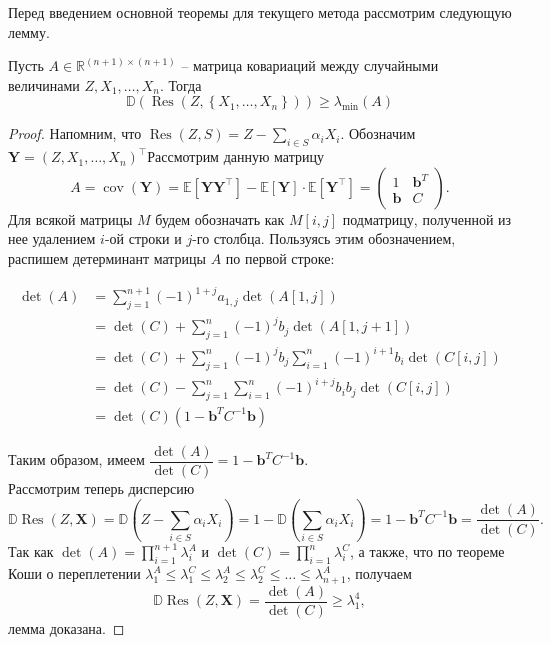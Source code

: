 \documentclass[preprint,12pt]{elsarticle}
\begin{document}
Перед введением основной теоремы для текущего метода рассмотрим следующую лемму.
\begin{lemma}
Пусть $A\in\mathbb{R}^{(n+1)\times(n+1)}$ -- матрица ковариаций между случайными величинами $Z, X_1, \dots, X_n$. Тогда 
$$\mathbb{D}\left(\operatorname{Res}\left(Z,\left\{X_{1}, \ldots, X_{n}\right\}\right)\right) \geq \lambda_{\min }(A)$$
\end{lemma}
\begin{proof}
Напомним, что 
$\operatorname{Res}(Z, S)=Z-\sum\limits_{i \in S} \alpha_{i} X_{i}$. Обозначим $\mathbf{Y}= (Z, X_1, \dots, X_n)^\top $Рассмотрим данную матрицу 
$$A=\operatorname{cov}(\mathbf{Y})=\mathbb{E}\left[\mathbf{Y Y}^{\top}\right]-\mathbb{E}[\mathbf{Y}] \cdot \mathbb{E}\left[\mathbf{Y}^{\top}\right]=\left(\begin{array}{ll}
1 & \mathbf{b}^{T} \\
\mathbf{b} & C
\end{array}\right).$$
Для всякой матрицы $M$ будем обозначать как $M[i,j]$ подматрицу, полученной из нее удалением $i$-ой строки и $j$-го столбца. Пользуясь этим обозначением, распишем детерминант матрицы $A$ по первой строке:

\begin{equation}\begin{aligned}
\operatorname{det}(A) &=\sum_{j=1}^{n+1}(-1)^{1+j} a_{1, j} \operatorname{det}(A[1, j]) \\
&=\operatorname{det}(C)+\sum_{j=1}^{n}(-1)^{j} b_{j} \operatorname{det}(A[1, j+1]) \\
&=\operatorname{det}(C)+\sum_{j=1}^{n}(-1)^{j} b_{j} \sum_{i=1}^{n}(-1)^{i+1} b_{i} \operatorname{det}(C[i, j]) \\
&=\operatorname{det}(C)-\sum_{j=1}^{n} \sum_{i=1}^{n}(-1)^{i+j} b_{i} b_{j} \operatorname{det}(C[i, j]) \\
&=\operatorname{det}(C)\left(1-\mathbf{b}^{T} C^{-1} \mathbf{b}\right)
\end{aligned}\end{equation}

Таким образом, имеем $\dfrac{\operatorname{det}(A)}{\operatorname{det}(C)}=1-\mathbf{b}^{T} C^{-1} \mathbf{b}$.\\

Рассмотрим теперь дисперсию 
\[\mathbb{D}\operatorname{Res}(Z, \mathbf{X})=\mathbb{D}(Z-\sum\limits_{i \in S} \alpha_{i} X_{i})=1-\mathbb{D}(\sum\limits_{i \in S} \alpha_{i} X_{i})= 1-\mathbf{b}^{T} C^{-1} \mathbf{b}=\dfrac{\operatorname{det}(A)}{\operatorname{det}(C)}.\]
Так как
$\operatorname{det}(A)=\prod_{i=1}^{n+1} \lambda_{i}^{A}$ и $\operatorname{det}(C)=\prod_{i=1}^{n} \lambda_{i}^{C}$, а также, что по теореме Коши о переплетении \cite{gowda2011cauchy} $\lambda_{1}^{A} \leq \lambda_{1}^{C} \leq \lambda_{2}^{A} \leq \lambda_{2}^{C} \leq \ldots \leq \lambda_{n+1}^{A}$, получаем 
\[\mathbb{D}\operatorname{Res}(Z, \mathbf{X})=\frac{\operatorname{det}(A)}{\operatorname{det}(C)} \geq \lambda_{1}^{4},\]
лемма доказана.
\end{proof}
\end{document}
